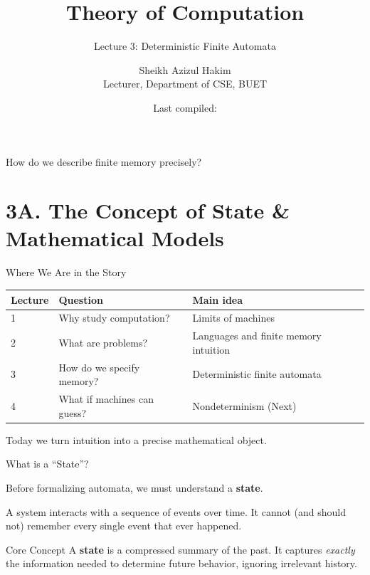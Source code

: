 \documentclass[10pt,aspectratio=169]{beamer}
\title{Theory of Computation}
\subtitle{Lecture 3: Deterministic Finite Automata}
\author{Sheikh Azizul Hakim\\Lecturer, Department of CSE, BUET}
\date{Last compiled: \LastCompiled}
\begin{document}
\maketitle

\begin{frame}[standout]
How do we describe finite memory precisely?
\end{frame}

\section{3A. The Concept of State \& Mathematical Models}

\begin{frame}{Where We Are in the Story}

\begin{center}
\begin{tabular}{lll}
\toprule
\textbf{Lecture} & \textbf{Question} & \textbf{Main idea}\\
\midrule
1 & Why study computation? & Limits of machines\\
2 & What are problems? & Languages and finite memory intuition\\
3 & How do we specify memory? & Deterministic finite automata\\
4 & What if machines can guess? & Nondeterminism (Next)\\
\bottomrule
\end{tabular}
\end{center}

\vspace{1em}

Today we turn intuition into a precise mathematical object.

\end{frame}

\begin{frame}{What is a ``State''?}

Before formalizing automata, we must understand a \textbf{state}.

\vspace{1em}

A system interacts with a sequence of events over time. It cannot (and should not) remember every single event that ever happened.

\vspace{1em}

\begin{alertblock}{Core Concept}
A \textbf{state} is a compressed summary of the past. It captures \emph{exactly} the information needed to determine future behavior, ignoring irrelevant history.
\end{alertblock}

\end{frame}
\end{document}
